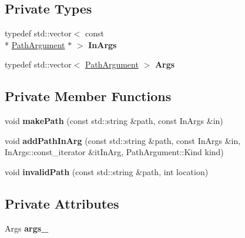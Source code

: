 \subsection*{Private Types}
\begin{DoxyCompactItemize}
\item 
\hypertarget{class_json_1_1_path_a763349989466ac275fad176708378f95}{typedef std\-::vector$<$ const \\*
\hyperlink{class_json_1_1_path_argument}{Path\-Argument} $\ast$ $>$ {\bfseries In\-Args}}\label{class_json_1_1_path_a763349989466ac275fad176708378f95}

\item 
\hypertarget{class_json_1_1_path_a27d96232d034d7a78286468676f9cb3e}{typedef std\-::vector$<$ \hyperlink{class_json_1_1_path_argument}{Path\-Argument} $>$ {\bfseries Args}}\label{class_json_1_1_path_a27d96232d034d7a78286468676f9cb3e}

\end{DoxyCompactItemize}
\subsection*{Private Member Functions}
\begin{DoxyCompactItemize}
\item 
\hypertarget{class_json_1_1_path_a874e5339f8059ebeef049721f8897277}{void {\bfseries make\-Path} (const std\-::string \&path, const In\-Args \&in)}\label{class_json_1_1_path_a874e5339f8059ebeef049721f8897277}

\item 
\hypertarget{class_json_1_1_path_af4d2ab3a6f09b69bab3d3e9fcdf13328}{void {\bfseries add\-Path\-In\-Arg} (const std\-::string \&path, const In\-Args \&in, In\-Args\-::const\-\_\-iterator \&it\-In\-Arg, Path\-Argument\-::\-Kind kind)}\label{class_json_1_1_path_af4d2ab3a6f09b69bab3d3e9fcdf13328}

\item 
\hypertarget{class_json_1_1_path_a3729e6d3682338b2cfad2c10d4746f53}{void {\bfseries invalid\-Path} (const std\-::string \&path, int location)}\label{class_json_1_1_path_a3729e6d3682338b2cfad2c10d4746f53}

\end{DoxyCompactItemize}
\subsection*{Private Attributes}
\begin{DoxyCompactItemize}
\item 
\hypertarget{class_json_1_1_path_af33d0de7ee9f99d3e361bdf504dc2bc7}{Args {\bfseries args\-\_\-}}\label{class_json_1_1_path_af33d0de7ee9f99d3e361bdf504dc2bc7}

\end{DoxyCompactItemize}


